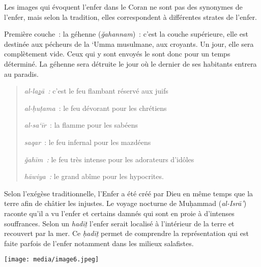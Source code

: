 
Les images qui évoquent l'enfer dans le Coran ne sont pas des synonymes
de l'enfer, mais selon la tradition, elles correspondent à différentes
strates de l'enfer.

Première couche~: la géhenne (\emph{ğahannam})~: c'est la couche
supérieure, elle est destinée aux pécheurs de la `Umma musulmane, aux
croyants. Un jour, elle sera complètement vide. Ceux qui y sont envoyés
le sont donc pour un temps déterminé. La géhenne sera détruite le jour
où le dernier de ses habitants entrera au paradis.

\begin{quote}
\emph{al-la\underline{z}ā~:} c'est le feu flambant réservé aux juifs

\emph{al-ḥuṭama~}: le feu dévorant pour les chrétiens

\emph{al-sa`īr~}: la flamme pour les sabéens

\emph{saqar}~: le feu infernal pour les mazdéens

\emph{ǧahīm~:} le feu très intense pour les adorateurs d'idôles

\emph{hāwiya~:} le grand abîme pour les hypocrites.
\end{quote}


Selon l'exégèse traditionnelle, l'Enfer a été créé par Dieu en même
temps que la terre afin de châtier les injustes. Le voyage nocturne de
Muḥammad (\emph{al-Isrā'}) raconte qu'il a vu l'enfer et certains damnés
qui sont en proie à d'intenses souffrances. Selon un \emph{hadīṯ}
l'enfer serait localisé à l'intérieur de la terre et recouvert par la
mer. Ce \emph{ḥadīṯ} permet de
comprendre la représentation qui est faite parfois de l'enfer notamment
dans les milieux salafistes.

\texttt{[image: media/image6.jpeg]}


